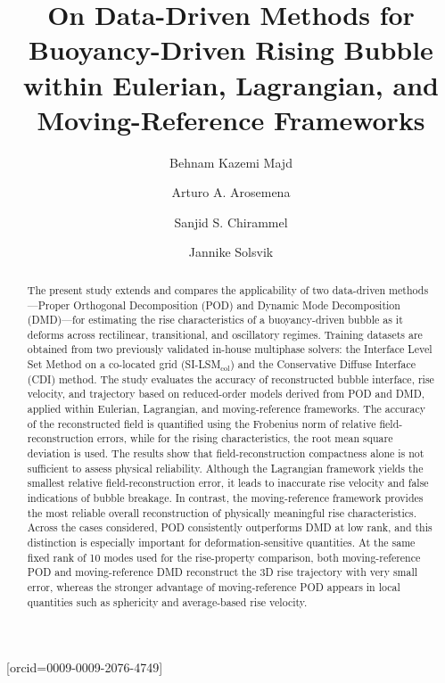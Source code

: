 \documentclass[a4paper,fleqn]{cas-sc}
\begin{document}
	

	

	

	\title[mode=title]{On Data-Driven Methods for Buoyancy-Driven Rising Bubble within Eulerian, Lagrangian, and Moving-Reference Frameworks}  
	
	

	\author[1]{Behnam Kazemi Majd}[orcid=0009-0009-2076-4749]
	\cormark[1]
	
	\author[1]{Arturo A. Arosemena}
	\author[1]{Sanjid S. Chirammel}
	\author[1]{Jannike Solsvik}
	



	
	
	
	\begin{abstract}
		The present study extends and compares the applicability of two data-driven methods—Proper Orthogonal Decomposition (POD) and Dynamic Mode Decomposition (DMD)—for estimating the rise characteristics of a buoyancy-driven bubble as it deforms across rectilinear, transitional, and oscillatory regimes. Training datasets are obtained from two previously validated in-house multiphase solvers: the  Interface Level Set Method on a co-located grid (SI-LSM$_{\text{col}}$) and the Conservative Diffuse Interface (CDI) method. The study evaluates the accuracy of reconstructed bubble interface, rise velocity, and trajectory based on reduced-order models derived from POD and DMD, applied within Eulerian, Lagrangian, and moving-reference frameworks. The accuracy of the reconstructed field is quantified using the Frobenius norm of relative field-reconstruction errors, while for the rising characteristics, the root mean square deviation is used. The results show that field-reconstruction compactness alone is not sufficient to assess physical reliability. Although the Lagrangian framework yields the smallest relative field-reconstruction error, it leads to inaccurate rise velocity and false indications of bubble breakage.
In contrast, the moving-reference framework provides the most reliable overall reconstruction of physically meaningful rise characteristics. Across the cases considered, POD consistently outperforms DMD at low rank, and this distinction is especially important for deformation-sensitive quantities. At the same fixed rank of 10 modes used for the rise-property comparison, both moving-reference POD and moving-reference DMD reconstruct the 3D rise trajectory with very small error, whereas the stronger advantage of moving-reference POD appears in local quantities such as sphericity and average-based rise velocity.
		
	\end{abstract}
	
\end{document}
